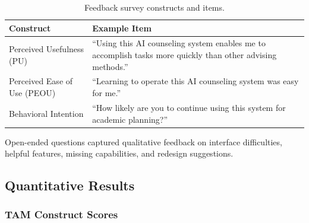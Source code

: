 \documentclass[letterpaper,11pt]{article}
\begin{document}
\begin{table}[htbp]
\caption{Feedback survey constructs and items.}
\label{tab:constructs}
\centering
\begin{tabular}{@{}lp{8cm}@{}}
\toprule
\textbf{Construct} & \textbf{Example Item} \\
\midrule
Perceived Usefulness (PU) & ``Using this AI counseling system enables me to accomplish tasks more quickly than other advising methods.'' \\
Perceived Ease of Use (PEOU) & ``Learning to operate this AI counseling system was easy for me.'' \\
Behavioral Intention & ``How likely are you to continue using this system for academic planning?'' \\
\bottomrule
\end{tabular}
\end{table}

Open-ended questions captured qualitative feedback on interface difficulties, helpful features, missing capabilities, and redesign suggestions.

\subsection{Quantitative Results}\label{subsec:quantresults}

\subsubsection{TAM Construct Scores}
\end{document}
